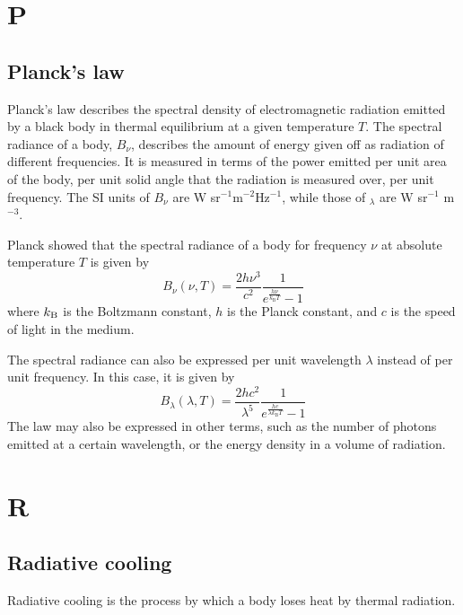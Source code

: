 \documentclass[11pt]{article}
\begin{document}
\section*{P}
    \subsection*{Planck's law}
    Planck's law describes the spectral density of electromagnetic
    radiation emitted by a black body in thermal equilibrium at a given
    temperature $T$.  The spectral radiance of a body, $B_{\nu}$, describes the
    amount of energy given off as radiation of different 
    frequencies. It is measured in terms of the power emitted per unit
    area of the body, per unit solid angle that the radiation is measured
    over, per unit frequency. 
    The SI units of $B_{\nu}$ are W sr$^{-1}$m$^{-2}$Hz$^{-1}$,
    while those of $_{\lambda}$ are W sr$^{-1}$ m$^{-3}$.

    Planck showed that the spectral radiance of a body for frequency $\nu$ at absolute temperature $T$ is given by
    \begin{equation}
      B_{\nu }(\nu ,T)={\frac {2h\nu ^{3}}{c^{2}}}{\frac {1}{e^{\frac {h\nu }{k_{\mathrm {B} }T}}-1}}
    \end{equation}
    where $k_{\rm B}$ is the Boltzmann constant, $h$ is the Planck constant, and $c$ is the speed of light in the medium. 

    The spectral radiance can also be expressed per unit wavelength
    $\lambda$ instead of per unit frequency.  In this case, it is given by
    \begin{equation}
      B_{\lambda }(\lambda ,T)={\frac {2hc^{2}}{\lambda ^{5}}}{\frac {1}{e^{\frac {hc}{\lambda k_{\mathrm {B} }T}}-1}} 
    \end{equation}
    The law may also be expressed in other terms, such as the number
of photons emitted at a certain wavelength, or the energy density in a
volume of radiation.


\section*{R}

\subsection*{Radiative cooling}
Radiative cooling is the process by which a body loses heat by thermal radiation.
\end{document}
